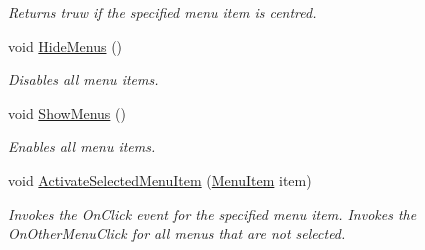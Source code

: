 \begin{DoxyCompactItemize}
\begin{DoxyCompactList}\small\item\em Returns truw if the specified menu item is centred. \end{DoxyCompactList}\item 
void \hyperlink{class_swipe_menu_1_1_menu_a2c997446adaef905f4b3b7daf0560dbb}{Hide\+Menus} ()
\begin{DoxyCompactList}\small\item\em Disables all menu items. \end{DoxyCompactList}\item 
void \hyperlink{class_swipe_menu_1_1_menu_a13a3119877097dd64a58c42702f15085}{Show\+Menus} ()
\begin{DoxyCompactList}\small\item\em Enables all menu items. \end{DoxyCompactList}\item 
void \hyperlink{class_swipe_menu_1_1_menu_a138934668e875f1950008025491d3df5}{Activate\+Selected\+Menu\+Item} (\hyperlink{class_swipe_menu_1_1_menu_item}{Menu\+Item} item)
\begin{DoxyCompactList}\small\item\em Invokes the On\+Click event for the specified menu item. Invokes the On\+Other\+Menu\+Click for all menus that are not selected. \end{DoxyCompactList}\end{DoxyCompactItemize}
